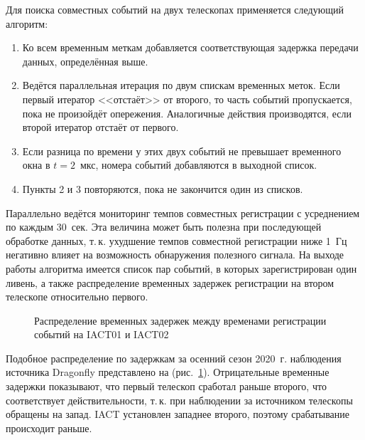 \documentclass[magd,floatypics,numeref]{msudipl} %
\begin{document}
Для поиска совместных событий на двух телескопах применяется следующий алгоритм: 
\begin{enumerate}
\item Ко всем временным меткам добавляется соответствующая задержка передачи данных, определённая выше.
\item Ведётся параллельная итерация по двум спискам временных меток. Если первый итератор <<отстаёт>> от второго, то часть событий пропускается, пока не произойдёт опережения. Аналогичные действия производятся, если второй итератор отстаёт от первого.
\item Если разница по времени у этих двух событий не превышает временного окна в $t=2$~мкс, номера событий добавляются в выходной список.
\item Пункты 2 и 3 повторяются, пока не закончится один из списков. 
\end{enumerate}

Параллельно ведётся мониторинг темпов совместных регистрации с усреднением по каждым 30~сек. Эта величина может быть полезна при последующей обработке данных, т.\,к. ухудшение темпов совместной регистрации ниже 1~Гц негативно влияет на возможность обнаружения полезного сигнала. На выходе работы алгоритма имеется список пар событий, в которых зарегистрирован один ливень, а также распределение временных задержек регистрации  на втором телескопе относительно первого.
\begin{figure}[t]
	\noindent{}
	\caption{Распределение временных задержек между временами регистрации событий на IACT01 и IACT02}
	\label{pic:iactDeltas}
\end{figure}
Подобное распределение по задержкам за осенний сезон 2020~г. наблюдения источника Dragonfly представлено на (рис.~\ref{pic:iactDeltas}\afterpage{\clearpage}). Отрицательные временные задержки показывают, что первый телескоп сработал раньше второго, что соответствует действительности, т.\,к. при наблюдении за источником телескопы обращены на запад.  IACT установлен западнее второго, поэтому срабатывание происходит раньше. 
\end{document}
